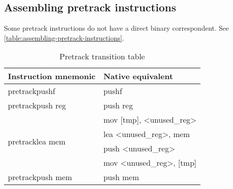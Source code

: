 \documentclass[12pt]{report}
\begin{document}
\subsection{Assembling pretrack instructions}
Some pretrack instructions do not have a direct binary correspondent. See \autoref{table:assembling-pretrack-instructions}.\\
\begin{table}[h]
	\begin{tabular}{| l | l |}
		\hline
		\textbf{Instruction mnemonic} & \textbf{Native equivalent}\\ \hline
		pretrackpushf &	pushf\\ \hline
		pretrackpush reg & push reg\\ \hline
		\multirow{4}{*}{pretracklea mem} & mov [tmp], <unused_reg>\\
		& lea <unused_reg>, mem\\
		& push <unused_reg>\\
		& mov <unused_reg>, [tmp]\\ \hline
		pretrackpush mem & push mem\\ \hline
	\end{tabular}
	\caption{Pretrack transition table}
	\label{table:assembling-pretrack-instructions}
\end{table}
\end{document}
